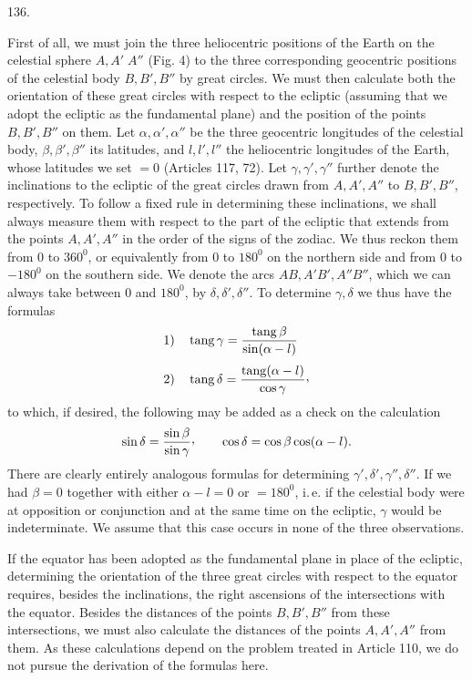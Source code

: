 \par{}\medskip
\begin{center}\hypertarget{native-182-article136}{}136.\end{center}
First of all, we must join the three heliocentric positions of the Earth on the celestial sphere
$A,A'\;A''$ (Fig. 4) to the three corresponding geocentric positions of the celestial body $B,B',B''$ by
great circles. We must then calculate both the orientation of these great circles with respect
to the ecliptic (assuming that we adopt the ecliptic as the fundamental plane) and the position
of the points $B,B',B''$ on them. Let $\alpha,\alpha',\alpha''$ be the three geocentric longitudes of the celestial body,
$\beta,\beta',\beta''$ its latitudes, and $l,l',l''$ the heliocentric longitudes of the Earth, whose latitudes we set
$=0$ (Articles 117, 72). Let $\gamma,\gamma',\gamma''$ further denote the inclinations to the ecliptic of the great
circles drawn from $A,A',A''$ to $B,B',B''$, respectively. To follow a fixed rule in determining these
inclinations, we shall always measure them with respect to the part of the ecliptic that extends
from the points $A,A',A''$ in the order of the signs of the zodiac. We thus reckon them from $0$
to $360^0$, or equivalently from $0$ to $180^0$ on the northern side and from $0$ to $-180^0$
on the southern side. We denote the arcs $AB,A'B',A''B''$, which we can always take between $0$ and
$180^0$, by $\delta,\delta',\delta''$. To determine $\gamma,\delta$ we thus have the formulas
\[
\begin{aligned}
1)\quad&\operatorname{tang}\gamma=\frac{\operatorname{tang}\beta}{\sin(\alpha-l)}\\[.7ex]
2)\quad&\operatorname{tang}\delta=\frac{\operatorname{tang}(\alpha-l)}{\cos\gamma}\mathpunct{\raisebox{.45ex}{,}}
\end{aligned}
\]
to which, if desired, the following may be added as a check on the calculation
\[
\sin\delta=\frac{\sin\beta}{\sin\gamma}\mathpunct{\raisebox{.45ex}{,}}\qquad
\cos\delta=\cos\beta\cos(\alpha-l).
\]
There are clearly entirely analogous formulas for determining $\gamma',\delta',\gamma'',\delta''$. If we had $\beta=0$ together
with either $\alpha-l=0$ or $=180^0$, i.\,e. if the celestial body were at opposition or conjunction and
at the same time on the ecliptic, $\gamma$ would be indeterminate. We assume that this case occurs
in none of the three observations.

If the equator has been adopted as the fundamental plane in place of the ecliptic, determining
the orientation of the three great circles with respect to the equator requires, besides the
inclinations, the right ascensions of the intersections with the \hypertarget{native-183}{}equator. Besides the
distances of the points $B,B',B''$ from these intersections, we must also calculate the distances of
the points $A,A',A''$ from them. As these calculations depend on the problem treated in Article 110,
we do not pursue the derivation of the formulas here.
